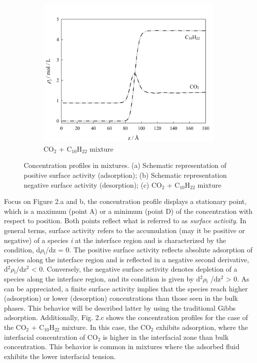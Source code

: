 \documentclass{scrbook}
\begin{document}
\begin{figure}
\begin{subfigure}{0.8\textwidth}
    \includegraphics[width=1\textwidth]{gfx/image4.png}
		\caption{CO$_{2}$ + C$_{10}$H$_{22}$ mixture} %
	\end{subfigure}
	\caption{Concentration profiles in mixtures. (a) Schematic representation of positive surface activity (adsorption); (b) Schematic representation negative surface activity (desorption); (c) CO$_{2}$ + C$_{10}$H$_{22}$ mixture} %
\end{figure}

Focus on Figure 2.a and b, the concentration profile displays a stationary point,
which is a maximum (point A) or a minimum (point D) of the concentration with
respect to position. Both points reflect what is referred to as \textit{surface
activity}. In general terms, surface activity refers to the accumulation (may
it be positive or negative) of a species \textit{i} at the interface region and
is characterized by the condition, d${\rho}$$_{\mathrm{i}}$/dz = 0. The
positive surface activity reflects absolute adsorption of species along the
interface region and is reflected in a negative second derivative,
d$^{2}$${\rho}$$_{\mathrm{i}}$/dz$^{2}$ {\textless} 0. Conversely, the negative
surface activity denotes depletion of a species along the interface region, and
its condition is given by d$^{2}$${\rho}$$_{\mathrm{i}}$ /dz$^{2}$
{\textgreater} 0. As can be appreciated, a finite surface activity implies that
the species reach higher (adsorption) or lower (desorption) concentrations than
those seen in the bulk phases. This behavior will be described latter by using
the traditional Gibbs adsorption. Additionally, Fig. 2.c shows the
concentration profiles for the case of the CO$_{2}$ + C$_{10}$H$_{22}$ mixture.
In this case, the CO$_{2}$ exhibits adsorption, where the interfacial
concentration of CO$_{2}$ is higher in the interfacial zone than bulk
concentration. This behavior is common in mixtures where the adsorbed fluid
exhibits the lower interfacial tension.     
\end{document}
